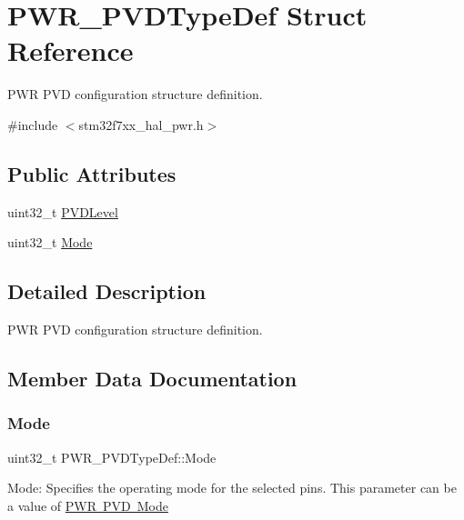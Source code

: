 \hypertarget{struct_p_w_r___p_v_d_type_def}{}\section{P\+W\+R\+\_\+\+P\+V\+D\+Type\+Def Struct Reference}
\label{struct_p_w_r___p_v_d_type_def}


P\+WR P\+VD configuration structure definition.  




{\ttfamily \#include $<$stm32f7xx\+\_\+hal\+\_\+pwr.\+h$>$}

\subsection*{Public Attributes}
\begin{DoxyCompactItemize}
\item 
uint32\+\_\+t \mbox{\hyperlink{struct_p_w_r___p_v_d_type_def_a540471bc6ac947fd8bc2c87f61d9faab}{P\+V\+D\+Level}}
\item 
uint32\+\_\+t \mbox{\hyperlink{struct_p_w_r___p_v_d_type_def_af692d691f0cb5871b319fd371fab34d8}{Mode}}
\end{DoxyCompactItemize}


\subsection{Detailed Description}
P\+WR P\+VD configuration structure definition. 

\subsection{Member Data Documentation}
\mbox{\label{struct_p_w_r___p_v_d_type_def_af692d691f0cb5871b319fd371fab34d8}} 
\subsubsection{\texorpdfstring{Mode}{Mode}}
{\footnotesize\ttfamily uint32\+\_\+t P\+W\+R\+\_\+\+P\+V\+D\+Type\+Def\+::\+Mode}

Mode\+: Specifies the operating mode for the selected pins. This parameter can be a value of \mbox{\hyperlink{group___p_w_r___p_v_d___mode}{P\+WR P\+VD Mode}} \mbox{\label{struct_p_w_r___p_v_d_type_def_a540471bc6ac947fd8bc2c87f61d9faab}} 
